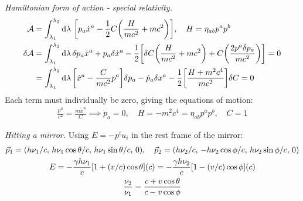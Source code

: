 \documentclass{report}
\begin{document}
\begin{subquests}
	\item \emph{Hamiltonian form of action - special relativity.}
	\begin{align*}
		\mathcal A & = \int_{\lambda_1}^{\lambda_2} \dd{\lambda}\, \bqty{p_a \dot x^a - \frac{1}{2}C\pqty{\frac{H}{mc^2} + mc^2}}, \quad H = \eta_{ab} p^a p^b \\
		\delta\mathcal A & = \int_{\lambda_1}^{\lambda_2} \dd{\lambda} \delta p_a \dot x^a + p_a \delta\dot x^a -\frac{1}{2}\bqty{\delta C\pqty{\frac{H}{mc^2} + mc^2} + C\pqty{\frac{2p^a\delta p_a}{mc^2}}} = 0 \\
		& = \int_{\lambda_1}^{\lambda_2} \dd{\lambda} \bqty{\dot x^a - \frac{C}{mc^2}p^a}\delta p_a - \dot p_a\delta x^a - \frac{1}{2}\bqty{\frac{H + m^2c^4}{mc^2}}\delta C = 0
	\end{align*}
	Each term must individually be zero, giving the equations of motion:
	\begin{gather*}
		\frac{p^a}{c^2} = \frac{m\dot x^a}{C} \implies \dot p_a = 0, \quad H = -m^2c^4 = \eta_{ab}p^a p^b, \quad C=1 
	\end{gather*}

	\item \emph{Hitting a mirror.}
	Using $E = -p^i u_i$ in the rest frame of the mirror:
	\begin{gather*}
		\vec p_1 = \pqty{h\nu_1/c,\, h\nu_1\cos\theta/c,\, h\nu_1\sin\theta/c,\,0}, \quad \vec p_2 = \pqty{h\nu_2/c,\, -h\nu_2\cos\phi/c,\, h\nu_2\sin\phi/c,\,0} \\
		E = -\frac{\gamma h \nu_1}{c}\bqty{1 + (v/c)\cos\theta}\pqty{c} = -\frac{\gamma h \nu_2}{c}\bqty{1 - (v/c)\cos\phi}\pqty{c} \\
		\frac{\nu_2}{\nu_1} = \frac{c + v\cos\theta}{c - v\cos\phi}
	\end{gather*}


\end{subquests}
\end{document}
